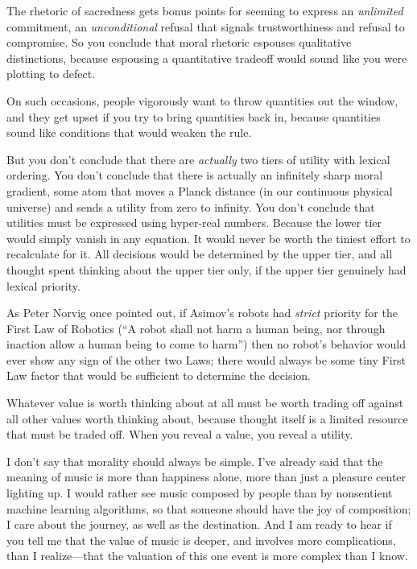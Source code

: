  The rhetoric of sacredness gets bonus points for seeming to
express an \textit{unlimited} commitment, an \textit{unconditional}
refusal that signals trustworthiness and refusal to compromise. So you
conclude that moral rhetoric espouses qualitative distinctions, because
espousing a quantitative tradeoff would sound like you were plotting to
defect.


 On such occasions, people vigorously want to throw quantities out
the window, and they get upset if you try to bring quantities back in,
because quantities sound like conditions that would weaken the rule.


 But you don't conclude that there are
\textit{actually} two tiers of utility with lexical ordering. You
don't conclude that there is actually an infinitely
sharp moral gradient, some atom that moves a Planck distance (in our
continuous physical universe) and sends a utility from zero to
infinity. You don't conclude that utilities must be
expressed using hyper-real numbers. Because the lower tier would simply
vanish in any equation. It would never be worth the tiniest effort to
recalculate for it. All decisions would be determined by the upper
tier, and all thought spent thinking about the upper tier only, if the
upper tier genuinely had lexical priority.


 As Peter Norvig once pointed out, if Asimov's
robots had \textit{strict} priority for the First Law of Robotics
(``A robot shall not harm a human being, nor through
inaction allow a human being to come to harm'') then
no robot's behavior would ever show any sign of the
other two Laws; there would always be some tiny First Law factor that
would be sufficient to determine the decision.


 Whatever value is worth thinking about at all must be worth
trading off against all other values worth thinking about, because
thought itself is a limited resource that must be traded off. When you
reveal a value, you reveal a utility.


 I don't say that morality should always be simple.
I've already said that the meaning of music is more
than happiness alone, more than just a pleasure center lighting up. I
would rather see music composed by people than by nonsentient machine
learning algorithms, so that someone should have the joy of
composition; I care about the journey, as well as the destination. And
I am ready to hear if you tell me that the value of music is deeper,
and involves more complications, than I realize---that the valuation of
this one event is more complex than I know.


